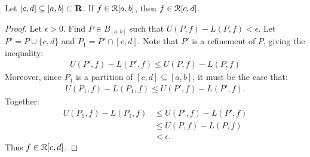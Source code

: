 \documentclass[10pt,twoside,openany]{memoir}
\begin{document}
    \begin{lemma}\label{lemma:1}
        Let $[c,d] \subseteq [a,b] \subset \mathbf{R}$. If $f \in \mathcal{R}[a,b]$, then $f \in \mathcal{R}[c,d]$.
    \end{lemma}
        \begin{proof}
            Let $\epsilon > 0$. Find $P \in B_{[a,b]}$ such that $U(P,f) - L(P,f) < \epsilon$. Let $P' = P \cup \{c,d\}$ and $P_1 = P' \cap [c,d]$. Note that $P'$ is a refinement of $P$, giving the inequality:
                \begin{equation*}
                \begin{split}
                    U(P',f) - L(P',f) \leq U(P,f) - L(P,f)
                \end{split}
                \end{equation*}
            Moreover, since $P_1$ is a partition of $[c,d] \subseteq [a,b]$, it must be the case that:
                \begin{equation*}
                \begin{split}
                    U(P_1,f) - L(P_1,f) \leq U(P',f) - L(P',f).
                \end{split}
                \end{equation*}
            Together:
                \begin{equation*}
                \begin{split}
                    U(P_1,f) - L(P_1,f)
                    & \leq U(P',f) - L(P',f) \\
                    & \leq U(P,f) - L(P,f) \\
                    & < \epsilon.
                \end{split}
                \end{equation*}
            Thus $f \in \mathcal{R}[c,d]$.
            \end{proof}
\end{document}
